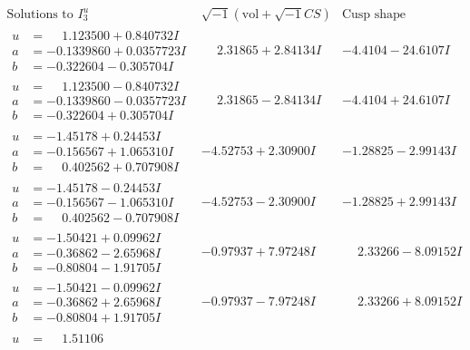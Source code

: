 \documentclass[1p]{elsarticle_modified}
\theoremstyle{definition}
\newcommand{\I}{\sqrt{-1}}
\begin{document}
$$\begin{array}{c|c|c}  
\text{Solutions to }I^u_{3}& \I (\text{vol} + \sqrt{-1}CS) & \text{Cusp shape}\\
 \hline 
\begin{aligned}
u &= \phantom{-}1.123500 + 0.840732 I \\
a &= -0.1339860 + 0.0357723 I \\
b &= -0.322604 - 0.305704 I\end{aligned}
 & \phantom{-}2.31865 + 2.84134 I & -4.4104 - 24.6107 I \\ \hline\begin{aligned}
u &= \phantom{-}1.123500 - 0.840732 I \\
a &= -0.1339860 - 0.0357723 I \\
b &= -0.322604 + 0.305704 I\end{aligned}
 & \phantom{-}2.31865 - 2.84134 I & -4.4104 + 24.6107 I \\ \hline\begin{aligned}
u &= -1.45178 + 0.24453 I \\
a &= -0.156567 + 1.065310 I \\
b &= \phantom{-}0.402562 + 0.707908 I\end{aligned}
 & -4.52753 + 2.30900 I & -1.28825 - 2.99143 I \\ \hline\begin{aligned}
u &= -1.45178 - 0.24453 I \\
a &= -0.156567 - 1.065310 I \\
b &= \phantom{-}0.402562 - 0.707908 I\end{aligned}
 & -4.52753 - 2.30900 I & -1.28825 + 2.99143 I \\ \hline\begin{aligned}
u &= -1.50421 + 0.09962 I \\
a &= -0.36862 - 2.65968 I \\
b &= -0.80804 - 1.91705 I\end{aligned}
 & -0.97937 + 7.97248 I & \phantom{-}2.33266 - 8.09152 I \\ \hline\begin{aligned}
u &= -1.50421 - 0.09962 I \\
a &= -0.36862 + 2.65968 I \\
b &= -0.80804 + 1.91705 I\end{aligned}
 & -0.97937 - 7.97248 I & \phantom{-}2.33266 + 8.09152 I \\ \hline\begin{aligned}
u &= \phantom{-}1.51106\phantom{ +0.000000I} \\

\end{aligned}
\end{array}$$
\end{document}
